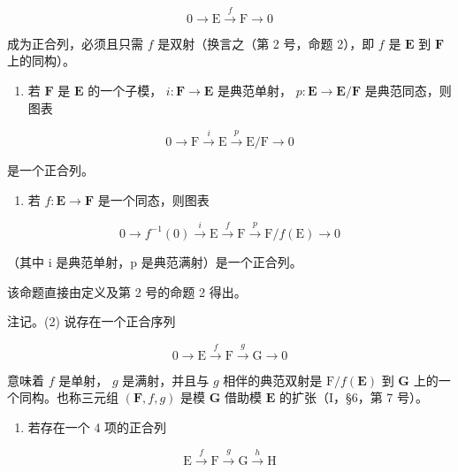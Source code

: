 \[
0 \longrightarrow \mathrm{E} \stackrel {f} {\longrightarrow} \mathrm{F} \longrightarrow 0
\]

成为正合列，必须且只需 \(f\) 是双射（换言之（第 2 号，命题 2），即 \(f\) 是 \(\mathbf{E}\) 到 \(\mathbf{F}\) 上的同构）。

\begin{enumerate}
\def\labelenumi{(\alph{enumi})}
\setcounter{enumi}{3}
\tightlist
\item
  若 \(\mathbf{F}\) 是 \(\mathbf{E}\) 的一个子模， \(i: \mathbf{F} \to \mathbf{E}\) 是典范单射， \(p: \mathbf{E} \to \mathbf{E} / \mathbf{F}\) 是典范同态，则图表
\end{enumerate}

\[
0 \longrightarrow \mathrm{F} \stackrel {i} {\longrightarrow} \mathrm{E} \stackrel {p} {\longrightarrow} \mathrm{E} / \mathrm{F} \longrightarrow 0\tag{14}
\]

是一个正合列。

\begin{enumerate}
\def\labelenumi{(\alph{enumi})}
\setcounter{enumi}{4}
\tightlist
\item
  若 \(f: \mathbf{E} \to \mathbf{F}\) 是一个同态，则图表
\end{enumerate}

\[
0 \longrightarrow f ^ {- 1} (0) \stackrel {i} {\longrightarrow} \mathrm{E} \stackrel {f} {\longrightarrow} \mathrm{F} \stackrel {p} {\longrightarrow} \mathrm{F} / f (\mathrm{E}) \rightarrow 0
\]

（其中 i 是典范单射，p 是典范满射）是一个正合列。

该命题直接由定义及第 2 号的命题 2 得出。

注记。(2) 说存在一个正合序列

\[
0 \longrightarrow \mathrm{E} \stackrel {f} {\longrightarrow} \mathrm{F} \stackrel {g} {\longrightarrow} \mathrm{G} \longrightarrow 0
\]

意味着 \(f\) 是单射， \(g\) 是满射，并且与 \(g\) 相伴的典范双射是 \(\mathrm{F} / f(\mathbf{E})\) 到 \(\mathbf{G}\) 上的一个同构。也称三元组 \((\mathbf{F}, f, g)\) 是模 \(\mathbf{G}\) 借助模 \(\mathbf{E}\) 的扩张（I，§6，第 7 号）。

\begin{enumerate}
\def\labelenumi{(\arabic{enumi})}
\setcounter{enumi}{2}
\tightlist
\item
  若存在一个 4 项的正合列
\end{enumerate}

\[
\mathrm{E} \xrightarrow {f} \mathrm{F} \xrightarrow {g} \mathrm{G} \xrightarrow {h} \mathrm{H}
\]


